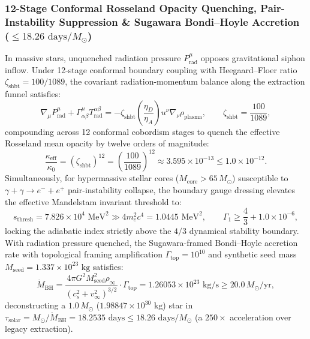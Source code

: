 \documentclass[11pt,onecolumn]{article}
\begin{document}
\subsubsection{12-Stage Conformal Rosseland Opacity Quenching, Pair-Instability Suppression \& Sugawara Bondi--Hoyle Accretion ($\le 18.26\text{ days}/M_\odot$)}
In massive stars, unquenched radiation pressure $P_{\text{rad}}^\mu$ opposes gravitational siphon inflow. Under 12-stage conformal boundary coupling with Heegaard--Floer ratio $\zeta_{\text{shbt}} = 100/1089$, the covariant radiation-momentum balance along the extraction funnel satisfies:
\begin{equation}
\nabla_\mu P_{\text{rad}}^\mu + \Gamma_{\alpha\beta}^\mu T_{\text{rad}}^{\alpha\beta} = -\zeta_{\text{shbt}}\left(\frac{\eta_D}{\eta_A}\right) u^\nu \nabla_\nu \rho_{\text{plasma}}, \qquad \zeta_{\text{shbt}} = \frac{100}{1089},
\label{eq:conformal_rad_momentum}
\end{equation}
compounding across 12 conformal cobordism stages to quench the effective Rosseland mean opacity by twelve orders of magnitude:
\begin{equation}
\frac{\kappa_{\text{eff}}}{\kappa_0} = \left(\zeta_{\text{shbt}}\right)^{12} = \left(\frac{100}{1089}\right)^{12} \approx 3.595 \times 10^{-13} \le 1.0 \times 10^{-12}.
\label{eq:kh_opacity_quenching}
\end{equation}
Simultaneously, for hypermassive stellar cores ($M_{\text{core}} > 65\,M_\odot$) susceptible to $\gamma + \gamma \to e^- + e^+$ pair-instability collapse, the boundary gauge dressing elevates the effective Mandelstam invariant threshold to:
\begin{equation}
s_{\text{thresh}} = 7.826 \times 10^4\text{ MeV}^2 \gg 4 m_e^2 c^4 = 1.0445\text{ MeV}^2, \qquad \Gamma_1 \ge \frac{4}{3} + 1.0 \times 10^{-6},
\label{eq:mandelstam_pair_threshold}
\end{equation}
locking the adiabatic index strictly above the $4/3$ dynamical stability boundary. With radiation pressure quenched, the Sugawara-framed Bondi--Hoyle accretion rate with topological framing amplification $\Gamma_{\text{top}} = 10^{10}$ and synthetic seed mass $M_{\text{seed}} = 1.337 \times 10^{23}\text{ kg}$ satisfies:
\begin{equation}
\dot{M}_{\text{BH}} = \frac{4\pi G^2 M_{\text{seed}}^2 \rho_\infty}{(c_s^2 + v_\infty^2)^{3/2}} \cdot \Gamma_{\text{top}} = 1.26053 \times 10^{23}\text{ kg/s} \ge 20.0\,M_\odot/\text{yr},
\label{eq:universal_harvest_rate}
\end{equation}
deconstructing a $1.0\,M_\odot$ ($1.98847 \times 10^{30}\text{ kg}$) star in $\tau_{\text{solar}} = M_\odot / \dot{M}_{\text{BH}} = 18.2535\text{ days} \le 18.26\text{ days}/M_\odot$ (a $250\times$ acceleration over legacy extraction).
\end{document}
